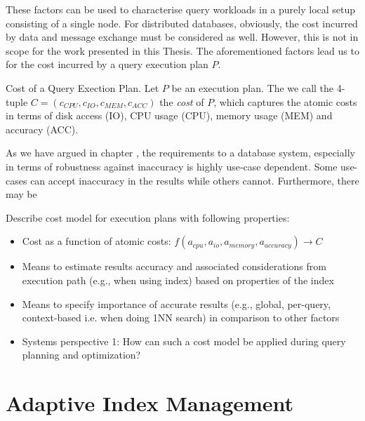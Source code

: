 These factors can be used to characterise query workloads in a purely local setup consisting of a single node. For distributed databases, obviously, the cost incurred by data and message exchange must be considered as well. However, this is not in scope for the work presented in this Thesis. The aforementioned factors lead us to  for the cost incurred by a query execution plan $P$.

\begin{definition}[label=definition:cost]{Cost of a Query Exection Plan.}{}
    Let $P$ be an execution plan. The we call the 4-tuple $C = (c_{CPU}, c_{IO}, c_{MEM},c_{ACC})$ the \emph{cost} of $P$, which captures the atomic costs in terms of disk access (IO), CPU usage (CPU), memory usage (MEM) and accuracy (ACC).
\end{definition}

As we have argued in chapter , the requirements to a database system, especially in terms of robustness against inaccuracy is highly use-case dependent. Some use-cases can accept inaccuracy in the results while others cannot. Furthermore, there may be 

Describe cost model for execution plans with following properties:

\begin{itemize}
    \item Cost as a function of atomic costs: $f(a_{cpu}, a_{io}, a_{memory}, a_{accuracy}) \longrightarrow C$
    \item Means to estimate results accuracy and associated considerations from execution path (e.g., when using index) based on properties of the index
    \item Means to specify importance of accurate results (e.g., global, per-query, context-based i.e. when doing 1NN search) in comparison to other factors
    \item Systems perspective 1: How can such a cost model be applied during query planning and optimization?
\end{itemize}

\section{Adaptive Index Management}

